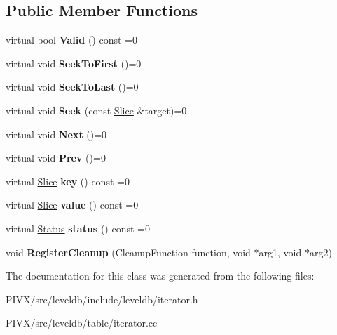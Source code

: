 \subsection*{Public Member Functions}
\begin{DoxyCompactItemize}
\item 
\mbox{\label{classleveldb_1_1_iterator_a38614978bfa0586327b8e237bcb46012}} 
virtual bool {\bfseries Valid} () const =0
\item 
\mbox{\label{classleveldb_1_1_iterator_a3594967cf26ddf1d37c7b886bb48627e}} 
virtual void {\bfseries Seek\+To\+First} ()=0
\item 
\mbox{\label{classleveldb_1_1_iterator_a8ad637f0a759e6d94cca6c5b4db440d3}} 
virtual void {\bfseries Seek\+To\+Last} ()=0
\item 
\mbox{\label{classleveldb_1_1_iterator_a97a556e97ded60c677fbf4de7321ec44}} 
virtual void {\bfseries Seek} (const \mbox{\hyperlink{classleveldb_1_1_slice}{Slice}} \&target)=0
\item 
\mbox{\label{classleveldb_1_1_iterator_aea54a5ca7eb942eb15770820529410e7}} 
virtual void {\bfseries Next} ()=0
\item 
\mbox{\label{classleveldb_1_1_iterator_a28798d802a203788587dc6adc5bc729e}} 
virtual void {\bfseries Prev} ()=0
\item 
\mbox{\label{classleveldb_1_1_iterator_ad17feced6e24a1b21db5ae6940c1f220}} 
virtual \mbox{\hyperlink{classleveldb_1_1_slice}{Slice}} {\bfseries key} () const =0
\item 
\mbox{\label{classleveldb_1_1_iterator_a613ac2e965518aad7a064c64c72bcf7c}} 
virtual \mbox{\hyperlink{classleveldb_1_1_slice}{Slice}} {\bfseries value} () const =0
\item 
\mbox{\label{classleveldb_1_1_iterator_ac84f34623a031b7eeb23409320f76376}} 
virtual \mbox{\hyperlink{classleveldb_1_1_status}{Status}} {\bfseries status} () const =0
\item 
\mbox{\label{classleveldb_1_1_iterator_a8c0281f9e4a2c9dceb37aad8128b636f}} 
void {\bfseries Register\+Cleanup} (Cleanup\+Function function, void $\ast$arg1, void $\ast$arg2)
\end{DoxyCompactItemize}


The documentation for this class was generated from the following files\+:\begin{DoxyCompactItemize}
\item 
P\+I\+V\+X/src/leveldb/include/leveldb/iterator.\+h\item 
P\+I\+V\+X/src/leveldb/table/iterator.\+cc\end{DoxyCompactItemize}

